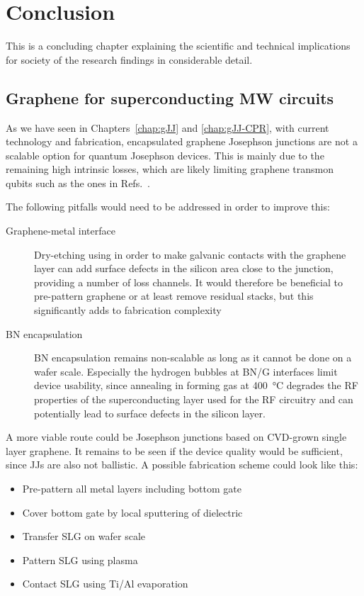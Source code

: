\newchapstyle
\chapter{Conclusion}
\label{chap:conclusion}

\afterpage{\pagecolor{none}}\newpage
This is a concluding chapter explaining the scientific and technical
implications for society of the research findings in considerable detail.

\section{Graphene for superconducting MW circuits}

As we have seen in Chapters~\ref{chap:gJJ} and \ref{chap:gJJ-CPR}, with current technology and fabrication, encapsulated graphene Josephson junctions are not a scalable option for quantum Josephson devices.
%
This is mainly due to the remaining high intrinsic losses, which are likely limiting graphene transmon qubits such as the ones in Refs.~\cite{krollMagneticFieldCompatible2018,wangCoherentControlHybrid2019}.

The following pitfalls would need to be addressed in order to improve this:
\begin{description}
	\item[Graphene-metal interface] Dry-etching using  in order to make galvanic contacts with the graphene layer can add surface defects in the silicon area close to the junction, providing a number of loss channels.
	It would therefore be beneficial to pre-pattern graphene or at least remove residual stacks, but this significantly adds to fabrication complexity
	\item[BN encapsulation] BN encapsulation remains non-scalable as long as it cannot be done on a wafer scale.
	Especially the hydrogen bubbles at BN/G interfaces limit device usability, since annealing in forming gas at \SI{400}{\celsius} degrades the RF properties of the superconducting layer used for the RF circuitry and can potentially lead to surface defects in the silicon layer.
\end{description}

A more viable route could be Josephson junctions based on CVD-grown single layer graphene.
%
It remains to be seen if the device quality would be sufficient, since  JJs are also not ballistic.
%
A possible fabrication scheme could look like this:
%
\begin{itemize}
	\item Pre-pattern all metal layers including bottom gate
	\item Cover bottom gate by local sputtering of dielectric
	\item Transfer SLG on wafer scale
	\item Pattern SLG using  plasma
	\item Contact SLG using Ti/Al evaporation
\end{itemize}


